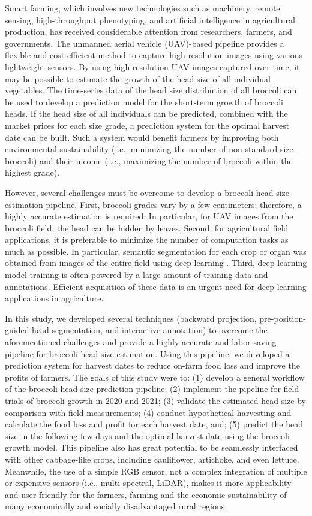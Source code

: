Smart farming, which involves new technologies such as machinery, remote sensing, high-throughput phenotyping, and artificial intelligence in agricultural production, has received considerable attention from researchers, farmers, and governments. The unmanned aerial vehicle (UAV)-based pipeline provides a flexible and cost-efficient method to capture high-resolution images using various lightweight sensors. By using high-resolution UAV images captured over time, it may be possible to estimate the growth of the head size of all individual vegetables. The time-series data of the head size distribution of all broccoli can be used to develop a prediction model for the short-term growth of broccoli heads. If the head size of all individuals can be predicted, combined with the market prices for each size grade, a prediction system for the optimal harvest date can be built. Such a system would benefit farmers by improving both environmental sustainability (i.e., minimizing the number of non-standard-size broccoli) and their income (i.e., maximizing the number of broccoli within the highest grade).

However, several challenges must be overcome to develop a broccoli head size estimation pipeline. First, broccoli grades vary by a few centimeters; therefore, a highly accurate estimation is required. In particular, for UAV images from the broccoli field, the head can be hidden by leaves. Second, for agricultural field applications, it is preferable to minimize the number of computation tasks as much as possible. In particular, semantic segmentation for each crop or organ was obtained from images of the entire field using deep learning \citep{bauer_combining_2019,zhou_automated_2022}. Third, deep learning model training is often powered by a large amount of training data and annotations. Efficient acquisition of these data is an urgent need for deep learning applications in agriculture.

In this study, we developed several techniques (backward projection, pre-position-guided head segmentation, and interactive annotation) to overcome the aforementioned challenges and provide a highly accurate and labor-saving pipeline for broccoli head size estimation. Using this pipeline, we developed a prediction system for harvest dates to reduce on-farm food loss and improve the profits of farmers. The goals of this study were to: (1) develop a general workflow of the broccoli head size prediction pipeline; (2) implement the pipeline for field trials of broccoli growth in 2020 and 2021; (3) validate the estimated head size by comparison with field measurements; (4) conduct hypothetical harvesting and calculate the food loss and profit for each harvest date, and; (5) predict the head size in the following few days and the optimal harvest date using the broccoli growth model. This pipeline also has great potential to be seamlessly interfaced with other cabbage-like crops, including cauliflower, artichoke, and even lettuce. Meanwhile, the use of a simple RGB sensor, not a complex integration of multiple or expensive sensors (i.e., multi-spectral, LiDAR), makes it more applicability and user-friendly for the farmers, farming and the economic sustainability of many economically and socially disadvantaged rural regions. 

